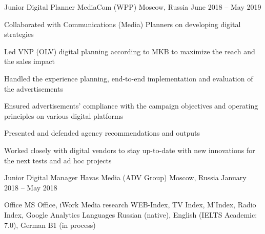 \documentclass[11pt, a4paper]{awesome-cv}
\begin{document}
\begin{cventries}
\cventry
	{Junior Digital Planner}
	{MediaCom (WPP)}
	{Moscow, Russia}
	{June 2018 -- May 2019}
	{
		\begin{cvitems}
			\item {Collaborated with Communications (Media) Planners on developing digital strategies}
			\item {Led VNP (OLV) digital planning according to MKB to maximize the reach and the sales impact}
			\item {Handled the experience planning, end-to-end implementation and evaluation of the advertisements}
			\item {Ensured advertisements' compliance with the campaign objectives and operating principles on various digital platforms}
			\item {Presented and defended agency recommendations and outputs}
			\item {Worked closely with digital vendors to stay up-to-date with new innovations for the next tests and ad hoc projects}
		\end{cvitems}
	}

\cventry
	{Junior Digital Manager}
	{Havas Media (ADV Group)}
	{Moscow, Russia}
	{January 2018 -- May 2018}
	{}

\end{cventries}

\begin{cvskills}
	\cvskill
		{Office}
		{MS Office, iWork}
	\cvskill
		{Media research}
		{WEB-Index, TV Index, M’Index, Radio Index, Google Analytics}
	\cvskill
		{Languages}
		{Russian (native), English (IELTS Academic: 7.0), German B1 (in process)}
\end{cvskills}
\end{document}

